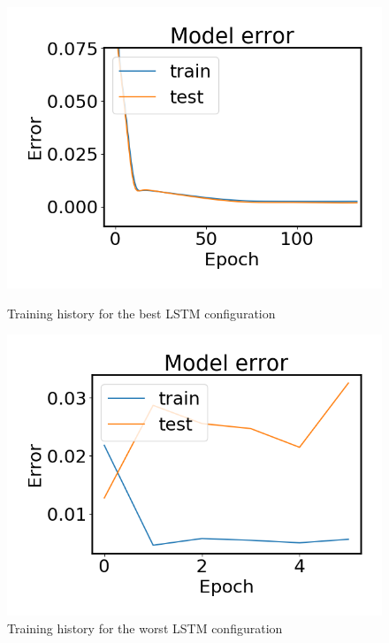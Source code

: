                 \begin{figure}
                    \begin{minipage}[b]{0.5\linewidth}
                        \centering
                        \includegraphics[width = \textwidth]{report/figures/analysis/lstm_gridsearch/best_lstm_error_zoomed.png}
                        \caption{Training history for the best LSTM configuration}
                        \label{fig:lstm_grid_error_best}
                    \end{minipage}
                    \begin{minipage}[b]{0.5\linewidth}
                        \centering
                        \includegraphics[width = \textwidth]{report/figures/analysis/lstm_gridsearch/worst_lstm_error_-1.png}
                        \caption{Training history for the worst LSTM configuration}
                        \label{fig:lstm_grid_error_worst}
                    \end{minipage}
                \end{figure}
        
